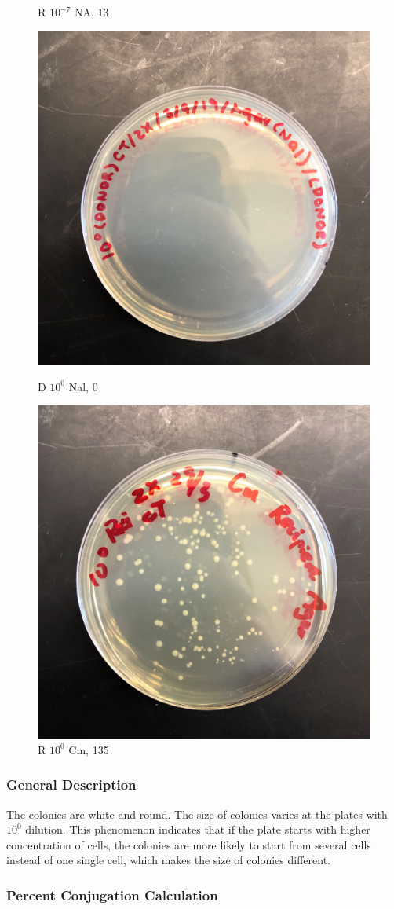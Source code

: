 \documentclass{article}
\begin{document}
\begin{figure}[H]
\begin{minipage}[t]{0.32\textwidth}
					\caption{R $10^{-7}$ NA, 13}
				\end{minipage}
			\end{figure}
			\begin{figure}[H]
				\begin{minipage}[t]{0.5\textwidth}
					\centering
					\includegraphics[width = 0.432\linewidth]{Done_0_Nal.jpg}
					\caption{D $10^0$ Nal, 0}
				\end{minipage}
				\begin{minipage}[t]{0.5\textwidth}
					\centering
					\includegraphics[width = 0.432\linewidth]{Reci_0_Cm.jpg}
					\caption{R $10 ^ 0$ Cm, 135}
				\end{minipage}
			\end{figure}
			\subsubsection{General Description} 
			The colonies are white and round. The size of colonies varies at the plates with $10 ^ 0$ dilution. This phenomenon indicates that if the plate starts with higher concentration of cells, the colonies are more likely to start from several cells instead of one single cell, which makes the size of colonies different.

			\subsubsection{Percent Conjugation Calculation} 
\end{document}
